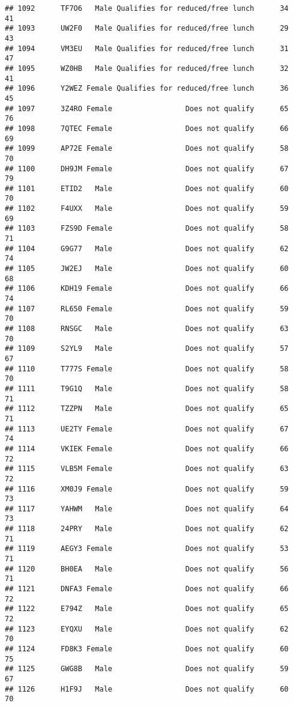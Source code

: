 \documentclass[
]{article}
\begin{document}
\begin{verbatim}
## 1092      TF7O6   Male Qualifies for reduced/free lunch      34       41
## 1093      UW2F0   Male Qualifies for reduced/free lunch      29       43
## 1094      VM3EU   Male Qualifies for reduced/free lunch      31       47
## 1095      WZ0HB   Male Qualifies for reduced/free lunch      32       41
## 1096      Y2WEZ Female Qualifies for reduced/free lunch      36       45
## 1097      3Z4RO Female                 Does not qualify      65       76
## 1098      7QTEC Female                 Does not qualify      66       69
## 1099      AP72E Female                 Does not qualify      58       70
## 1100      DH9JM Female                 Does not qualify      67       79
## 1101      ETID2   Male                 Does not qualify      60       70
## 1102      F4UXX   Male                 Does not qualify      59       69
## 1103      FZS9D Female                 Does not qualify      58       71
## 1104      G9G77   Male                 Does not qualify      62       74
## 1105      JW2EJ   Male                 Does not qualify      60       68
## 1106      KDH19 Female                 Does not qualify      66       74
## 1107      RL650 Female                 Does not qualify      59       70
## 1108      RNSGC   Male                 Does not qualify      63       70
## 1109      S2YL9   Male                 Does not qualify      57       67
## 1110      T777S Female                 Does not qualify      58       70
## 1111      T9G1Q   Male                 Does not qualify      58       71
## 1112      TZZPN   Male                 Does not qualify      65       71
## 1113      UE2TY Female                 Does not qualify      67       74
## 1114      VKIEK Female                 Does not qualify      66       72
## 1115      VLB5M Female                 Does not qualify      63       72
## 1116      XM0J9 Female                 Does not qualify      59       73
## 1117      YAHWM   Male                 Does not qualify      64       73
## 1118      24PRY   Male                 Does not qualify      62       71
## 1119      AEGY3 Female                 Does not qualify      53       71
## 1120      BH0EA   Male                 Does not qualify      56       71
## 1121      DNFA3 Female                 Does not qualify      66       72
## 1122      E794Z   Male                 Does not qualify      65       72
## 1123      EYQXU   Male                 Does not qualify      62       70
## 1124      FD8K3 Female                 Does not qualify      60       75
## 1125      GWG8B   Male                 Does not qualify      59       67
## 1126      H1F9J   Male                 Does not qualify      60       70

\end{verbatim}
\end{document}
